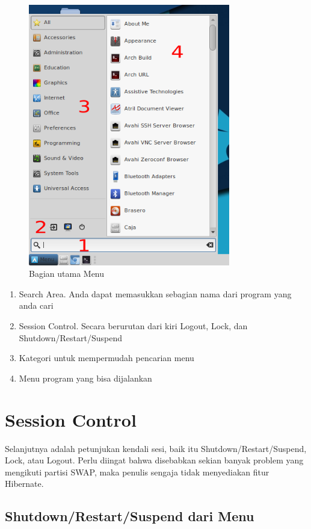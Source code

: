 \documentclass[12pt,]{article}
\begin{document}
	\begin{figure}[!ht]
		\centering
		\includegraphics[width=250pt]{png/menu_part}
		\caption{Bagian utama Menu}
	\end{figure}

	\begin{enumerate}
		\item Search Area. Anda dapat memasukkan sebagian nama dari program yang anda cari
		\item Session Control. Secara berurutan dari kiri Logout, Lock, dan Shutdown/Restart/Suspend
		\item Kategori untuk mempermudah pencarian menu
		\item Menu program yang bisa dijalankan
	\end{enumerate}

	\newpage

	\section{Session Control}

	Selanjutnya adalah petunjukan kendali sesi, baik itu Shutdown/Restart/Suspend, Lock, atau Logout.
	Perlu diingat bahwa disebabkan sekian banyak problem yang mengikuti partisi SWAP, maka penulis sengaja tidak menyediakan fitur Hibernate.

	\subsection{Shutdown/Restart/Suspend dari Menu}
\end{document}

